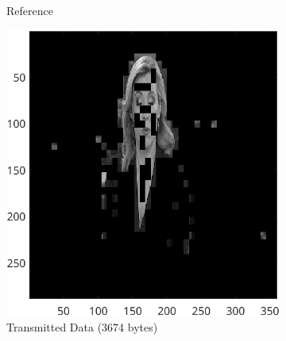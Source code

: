 \documentclass{article}
\begin{document}
\begin{figure}[ht]
\begin{subfigure}[t]{0.45\textwidth}
			\caption{Reference}
			\label{fig:2B_Input4Ref2}

		\end{subfigure}


			\begin{subfigure}[t]{0.45\textwidth}
			\centering

			\includegraphics[width=\textwidth]{2B_Input4TD2}

			\caption{Transmitted Data (3674 bytes)}
			\label{fig:2B_Input4TD2}

		\end{subfigure}
		\hspace{1cm}
		\begin{subfigure}[t]{0.45\textwidth}
			\centering


\end{subfigure}
\end{figure}
\end{document}
